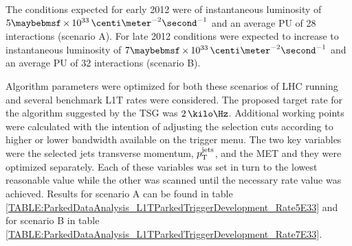 The conditions expected for early 2012 were of instantaneous luminosity of $5 \times 10^{33}\,\centi\meter^{-2}\second^{-1}$ and an average \gls{PU} of 28 interactions (scenario A). For late 2012 conditions were expected to increase to instantaneous luminosity of $7 \times 10^{33}\,\centi\meter^{-2}\second^{-1}$ and an average \gls{PU} of 32 interactions (scenario B).

Algorithm parameters were optimized for both these scenarios of \gls{LHC} running and several benchmark \gls{L1T} rates were considered. The proposed target rate for the algorithm  suggested by the \gls{TSG} was $2\,\kilo\Hz$. Additional working points were calculated with the intention of adjusting the selection cuts according to higher or lower bandwidth available on the trigger menu. The two key variables were the selected jets transverse momentum, $p_{\mathrm{T}}^{\text{jets}}$, and the \gls{MET} and they were optimized separately. Each of these variables was set in turn to the lowest reasonable value while the other was scanned until the necessary rate value was achieved.  Results for scenario A can be found in table \ref{TABLE:ParkedDataAnalysis_L1TParkedTriggerDevelopment_Rate5E33} and for scenario B in table \ref{TABLE:ParkedDataAnalysis_L1TParkedTriggerDevelopment_Rate7E33}.

